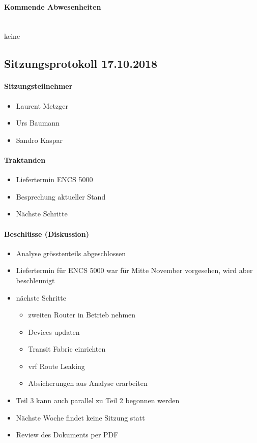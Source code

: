 \paragraph{Kommende Abwesenheiten} \mbox{}\\
keine

\newpage





\subsection{Sitzungsprotokoll 17.10.2018}

\paragraph{Sitzungsteilnehmer}
\begin{itemize}	
	\item Laurent Metzger 
	\item Urs Baumann
	\item Sandro Kaspar
\end{itemize}

\paragraph{Traktanden}
\begin{itemize}	
	\item Liefertermin ENCS 5000
	\item Besprechung aktueller Stand
	\item Nächste Schritte
\end{itemize}

\paragraph{Beschlüsse (Diskussion)}
\begin{itemize}	
	\item Analyse grösstenteils abgeschlossen
	\item Liefertermin für ENCS 5000 war für Mitte November vorgesehen, wird aber beschleunigt
	\item nächste Schritte
	\begin{itemize}
		\item zweiten Router in Betrieb nehmen
		\item Devices updaten
		\item Transit Fabric einrichten
		\item vrf Route Leaking
		\item Absicherungen aus Analyse erarbeiten
	\end{itemize}
	\item Teil 3 kann auch parallel zu Teil 2 begonnen werden
	\item Nächste Woche findet keine Sitzung statt
	\item Review des Dokuments per PDF
\end{itemize}

